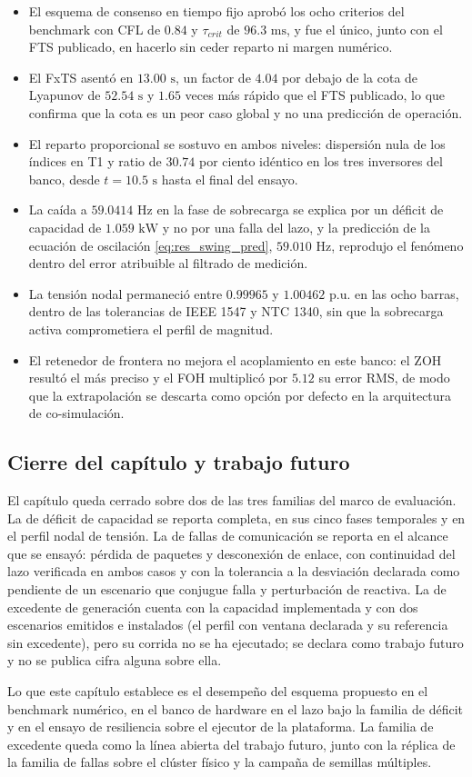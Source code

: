 \begin{itemize}
    \item El esquema de consenso en tiempo fijo aprobó los ocho criterios del benchmark con CFL de $0.84$ y $\tau_{crit}$ de $96.3\text{ ms}$, y fue el único, junto con el FTS publicado, en hacerlo sin ceder reparto ni margen numérico.
    \item El FxTS asentó en $13.00\text{ s}$, un factor de $4.04$ por debajo de la cota de Lyapunov de $52.54\text{ s}$ y $1.65$ veces más rápido que el FTS publicado, lo que confirma que la cota es un peor caso global y no una predicción de operación.
    \item El reparto proporcional se sostuvo en ambos niveles: dispersión nula de los índices en T1 y ratio de $30.74$ por ciento idéntico en los tres inversores del banco, desde $t = 10.5\text{ s}$ hasta el final del ensayo.
    \item La caída a $59.0414\text{ Hz}$ en la fase de sobrecarga se explica por un déficit de capacidad de $1.059\text{ kW}$ y no por una falla del lazo, y la predicción de la ecuación de oscilación \eqref{eq:res_swing_pred}, $59.010\text{ Hz}$, reprodujo el fenómeno dentro del error atribuible al filtrado de medición.
    \item La tensión nodal permaneció entre $0.99965$ y $1.00462\text{ p.u.}$ en las ocho barras, dentro de las tolerancias de IEEE 1547 y NTC 1340, sin que la sobrecarga activa comprometiera el perfil de magnitud.
    \item El retenedor de frontera no mejora el acoplamiento en este banco: el ZOH resultó el más preciso y el FOH multiplicó por $5.12$ su error RMS, de modo que la extrapolación se descarta como opción por defecto en la arquitectura de co-simulación.
\end{itemize}

\subsection{Cierre del capítulo y trabajo futuro}

El capítulo queda cerrado sobre dos de las tres familias del marco de evaluación. La de déficit de capacidad se reporta completa, en sus cinco fases temporales y en el perfil nodal de tensión. La de fallas de comunicación se reporta en el alcance que se ensayó: pérdida de paquetes y desconexión de enlace, con continuidad del lazo verificada en ambos casos y con la tolerancia a la desviación declarada como pendiente de un escenario que conjugue falla y perturbación de reactiva. La de excedente de generación cuenta con la capacidad implementada y con dos escenarios emitidos e instalados (el perfil con ventana declarada y su referencia sin excedente), pero su corrida no se ha ejecutado; se declara como trabajo futuro y no se publica cifra alguna sobre ella.

Lo que este capítulo establece es el desempeño del esquema propuesto en el benchmark numérico, en el banco de hardware en el lazo bajo la familia de déficit y en el ensayo de resiliencia sobre el ejecutor de la plataforma. La familia de excedente queda como la línea abierta del trabajo futuro, junto con la réplica de la familia de fallas sobre el clúster físico y la campaña de semillas múltiples.

